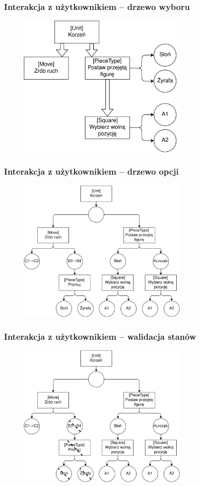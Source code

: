\documentclass{beamer}
\begin{document}
\begin{frame}
	\frametitle{Interakcja z użytkownikiem -- drzewo wyboru}
	\begin{figure}
		\includegraphics[height=7cm]{mess-choice-diagram.jpg}
		\centering
	\end{figure}
\end{frame}

\begin{frame}[noframenumbering]
	\frametitle{Interakcja z użytkownikiem -- drzewo opcji}
	\begin{figure}
		\includegraphics[height=7cm]{mess-option-diagram.jpg}
		\centering
	\end{figure}
\end{frame}

\begin{frame}[noframenumbering]
	\frametitle{Interakcja z użytkownikiem -- walidacja stanów}
	\begin{figure}
		\includegraphics[height=7cm]{mess-validator-diagram.jpg}
		\centering
	\end{figure}
\end{frame}
\end{document}
